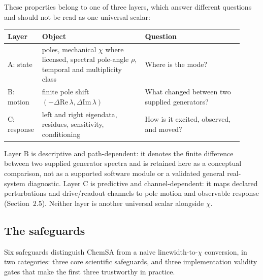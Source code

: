These properties belong to one of three layers, which answer different questions and should not be read as one universal scalar:

\begingroup\small
\noindent\begin{tabular}{@{}p{0.10\linewidth}p{0.42\linewidth}p{0.40\linewidth}@{}}
\toprule
Layer & Object & Question \\
\midrule
A: state & poles, mechanical $\chi$ where licensed, spectral pole-angle $\rho$, temporal and multiplicity class & Where is the mode? \\
B: motion & finite pole shift $(-\Delta\mathrm{Re}\,\lambda, \Delta\mathrm{Im}\,\lambda)$ & What changed between two supplied generators? \\
C: response & left and right eigendata, residues, sensitivity, conditioning & How is it excited, observed, and moved? \\
\bottomrule
\end{tabular}
\endgroup

Layer B is descriptive and path-dependent: it denotes the finite difference between two supplied generator spectra and is retained here as a conceptual comparison, not as a supported software module or a validated general real-system diagnostic. Layer C is predictive and channel-dependent: it maps declared perturbations and drive/readout channels to pole motion and observable response (Section~2.5). Neither layer is another universal scalar alongside $\chi$.

\subsection{The safeguards}

Six safeguards distinguish ChemSA from a naive linewidth-to-\(\chi\) conversion, in two categories: three core scientific safeguards, and three implementation validity gates that make the first three trustworthy in practice.

